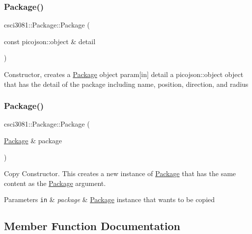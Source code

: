 \subsubsection{\texorpdfstring{Package()}{Package()}\hspace{0.1cm}{\footnotesize\ttfamily [1/2]}}
{\footnotesize\ttfamily csci3081\+::\+Package\+::\+Package (\begin{DoxyParamCaption}\item[{const picojson\+::object \&}]{detail }\end{DoxyParamCaption})}

Constructor, creates a \hyperlink{classcsci3081_1_1Package}{Package} object param\mbox{[}in\mbox{]} detail a picojson\+::object object that has the detail of the package including name, position, direction, and radius \mbox{\label{classcsci3081_1_1Package_a9a5517a9f494de1dda493c0613918e00}} 
\subsubsection{\texorpdfstring{Package()}{Package()}\hspace{0.1cm}{\footnotesize\ttfamily [2/2]}}
{\footnotesize\ttfamily csci3081\+::\+Package\+::\+Package (\begin{DoxyParamCaption}\item[{\hyperlink{classcsci3081_1_1Package}{Package} \&}]{package }\end{DoxyParamCaption})}



Copy Constructor. This creates a new instance of \hyperlink{classcsci3081_1_1Package}{Package} that has the same content as the \hyperlink{classcsci3081_1_1Package}{Package} argument. 


\begin{DoxyParams}[1]{Parameters}
\mbox{\tt in}  & {\em package} & \hyperlink{classcsci3081_1_1Package}{Package} instance that wants to be copied \\
\hline
\end{DoxyParams}


\subsection{Member Function Documentation}
\mbox{\label{classcsci3081_1_1Package_abf6700f1011412936069e7cff9ea86c9}} 

